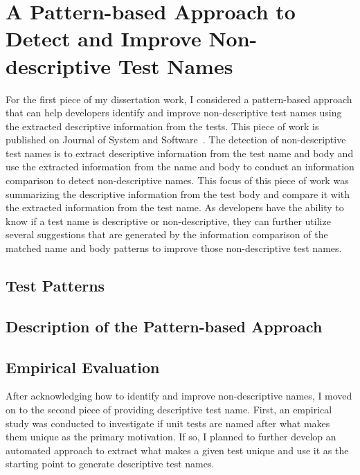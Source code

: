 \section{A Pattern-based Approach to Detect and Improve Non-descriptive Test Names}
\label{sec:test-pattern-section}

For the first piece of my dissertation work, I considered a pattern-based approach that can help developers identify and improve non-descriptive test names using the extracted descriptive information from the tests.
%
This piece of work is published on Journal of System and Software~\cite{wu2020pattern}.
%
The detection of non-descriptive test names is to extract descriptive information from the test name and body and use the extracted information  from the name and body to conduct an information comparison to detect non-descriptive names.
%
This focus of this piece of work was summarizing the descriptive information from the test body and compare it with the extracted information from the test name.
%
As developers have the ability to know if a test name is descriptive or non-descriptive, they can further utilize several suggestions that are generated by the information comparison of the matched name and body patterns to improve those non-descriptive test names.


\subsection{Test Patterns}
\label{sec:test_patterns}

\subsection{Description of the Pattern-based Approach}
\label{sec:approach-pattern}

\subsection{Empirical Evaluation}
\label{sec:evaluation-pattern}


After acknowledging how to identify and improve non-descriptive names, I moved on to the second piece of providing descriptive test name.
%
First, an empirical study was conducted to investigate if unit tests are named after what makes them unique as the primary motivation.
%
If so, I planned to further develop an automated approach to extract what makes a given test unique and use it as the starting point to generate descriptive test names.

